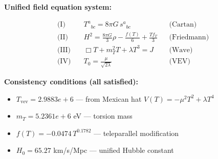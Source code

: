 
\textbf{Unified field equation system:}

\begin{align}
  \text{(I)} \quad & T^a{}_{bc} = 8\pi G \, s^a{}_{bc} && \text{(Cartan)} \\
  \text{(II)} \quad & H^2 = \frac{8\pi G}{3}\rho - \frac{f(T)}{6} + \frac{Tf_T}{3} && \text{(Friedmann)} \\
  \text{(III)} \quad & \Box T + m_T^2 T + \lambda T^3 = J && \text{(Wave)} \\
  \text{(IV)} \quad & T_0 = \frac{\mu}{\sqrt{2\lambda}} && \text{(VEV)}
\end{align}

\textbf{Consistency conditions (all satisfied):}
\begin{itemize}
  \item $T_{\text{vev}} = 2.9883e+6$ — from Mexican hat $V(T) = -\mu^2 T^2 + \lambda T^4$
  \item $m_T = 5.2361e+6$ eV — torsion mass
  \item $f(T) = -0.0474 \, T^{0.1782}$ — teleparallel modification
  \item $H_0 = 65.27$ km/s/Mpc — unified Hubble constant
\end{itemize}